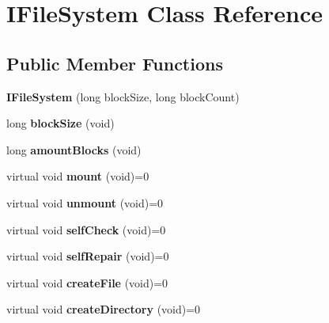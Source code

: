 \hypertarget{class_i_file_system}{}\section{I\+File\+System Class Reference}
\label{class_i_file_system}
\subsection*{Public Member Functions}
\begin{DoxyCompactItemize}
\item 
\mbox{\label{class_i_file_system_a6ce2b2c38629462050b9ec53eda0a248}} 
{\bfseries I\+File\+System} (long block\+Size, long block\+Count)
\item 
\mbox{\label{class_i_file_system_a493334ffcc971d8319bd00a141dca6e5}} 
long {\bfseries block\+Size} (void)
\item 
\mbox{\label{class_i_file_system_abd457a1423ac45a0c2e1fb980120dbf5}} 
long {\bfseries amount\+Blocks} (void)
\item 
\mbox{\label{class_i_file_system_a3b782dc67538f03ca70c341e166e29a3}} 
virtual void {\bfseries mount} (void)=0
\item 
\mbox{\label{class_i_file_system_a1ba6b4c1b5f79110be46f77c349308be}} 
virtual void {\bfseries unmount} (void)=0
\item 
\mbox{\label{class_i_file_system_a3c505ca813ca232455b98e33f3135738}} 
virtual void {\bfseries self\+Check} (void)=0
\item 
\mbox{\label{class_i_file_system_ac11cdfc1f70814d14ac0fce55755eb69}} 
virtual void {\bfseries self\+Repair} (void)=0
\item 
\mbox{\label{class_i_file_system_a5fb7b691c58f8a822c3b995ef92c23be}} 
virtual void {\bfseries create\+File} (void)=0
\item 
\mbox{\label{class_i_file_system_af2d36ebdf1539e6f63662e9f2be81a75}} 
virtual void {\bfseries create\+Directory} (void)=0

\end{DoxyCompactItemize}
